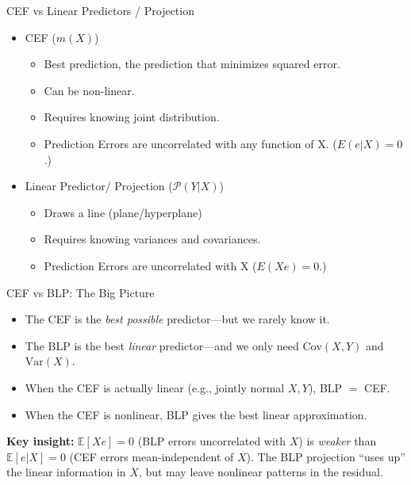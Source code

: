 \documentclass[aspectratio=169]{beamer}
\numberwithin{equation}{section}
\begin{document}
\begin{frame}{CEF vs Linear Predictors / Projection}
\begin{itemize}
\item CEF ($m(X)$)
\begin{itemize}
\item Best prediction, the prediction that minimizes squared error.
\item Can be non-linear.
\item Requires knowing joint distribution.
\item Prediction Errors are uncorrelated with any function of X. ($E(e|X)=0$.)
\end{itemize}

\item Linear Predictor/ Projection ($\mathcal{P}(Y|X)$)
\begin{itemize}
\item Draws a line (plane/hyperplane)
\item Requires knowing variances and covariances.
\item Prediction Errors are uncorrelated with X ($E(Xe)=0$.)
\end{itemize}
\end{itemize}
\end{frame}


\begin{frame}{CEF vs BLP: The Big Picture}
\begin{tcolorbox}[colback=blue!5, colframe=blue!50, title=Why Settle for Linear?]
\begin{itemize}
\item The CEF is the \emph{best possible} predictor---but we rarely know it.
\item The BLP is the best \emph{linear} predictor---and we only need $\text{Cov}(X,Y)$ and $\text{Var}(X)$.
\item When the CEF is actually linear (e.g., jointly normal $X,Y$), BLP $=$ CEF.
\item When the CEF is nonlinear, BLP gives the best linear approximation.
\end{itemize}
\end{tcolorbox}
\medskip\pause
\textbf{Key insight:}  $\mathbb{E}[Xe]=0$ (BLP errors uncorrelated with $X$) is \emph{weaker} than $\mathbb{E}[e|X]=0$ (CEF errors mean-independent of $X$).  The BLP projection ``uses up'' the linear information in $X$, but may leave nonlinear patterns in the residual.
\end{frame}
\end{document}
